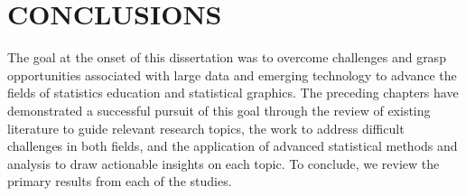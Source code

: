 \documentclass[11pt]{isuthesis}\usepackage[]{graphicx}\usepackage[]{color}
\newcommand\chaptocbreak{
	\addtocontents{toc}{\protect\needspace{4\baselineskip}}
	\addtocontents{lof}{\protect\needspace{2\baselineskip}}
	\addtocontents{lot}{\protect\needspace{2\baselineskip}}
}
\begin{document}
% 
% 
% 

\chaptocbreak

\chapter{CONCLUSIONS}
\label{ThesisEnd}

The goal at the onset of this dissertation was to overcome challenges and grasp opportunities associated with large data and emerging technology to advance the fields of statistics education and statistical graphics. The preceding chapters have demonstrated a successful pursuit of this goal through the review of existing literature to guide relevant research topics, the work to address difficult challenges in both fields, and the application of advanced statistical methods and analysis to draw actionable insights on each topic. To conclude, we review the primary results from each of the studies.
\end{document}
